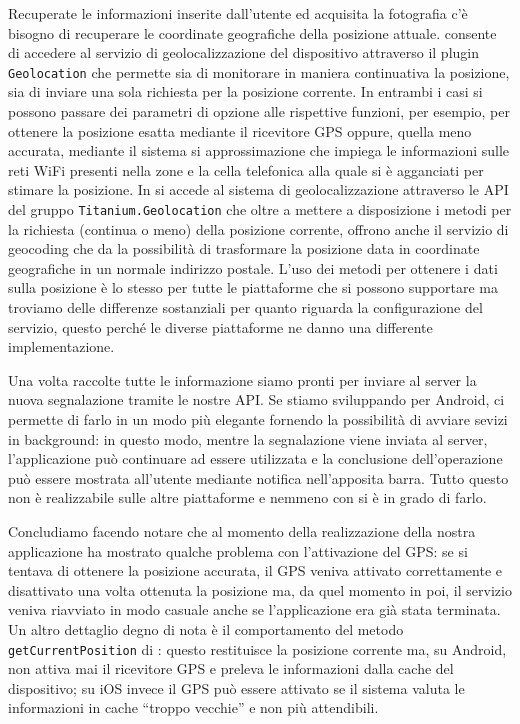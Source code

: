 			Recuperate le informazioni inserite dall'utente ed acquisita la
			fotografia c'è bisogno di recuperare le coordinate geografiche della
			posizione attuale. \pg{} consente di accedere al servizio di
			geolocalizzazione del dispositivo attraverso il plugin
			\texttt{Geolocation} che permette sia di monitorare in maniera
			continuativa la posizione, sia di inviare una sola richiesta per la
			posizione corrente. In entrambi i casi si possono passare dei
			parametri di opzione alle rispettive funzioni, per esempio, per
			ottenere la posizione esatta mediante il ricevitore GPS oppure,
			quella meno accurata, mediante il sistema si approssimazione che
			impiega le informazioni sulle reti WiFi presenti nella zone e la
			cella telefonica alla quale si è agganciati per stimare la
			posizione. In \tisdk{} si accede al sistema di
			geolocalizzazione attraverso le API del gruppo
			\texttt{Titanium.Geolocation} che oltre a mettere a disposizione i
			metodi per la richiesta (continua o meno) della posizione corrente,
			offrono anche il servizio di geocoding che da la possibilità di
			trasformare la posizione data in coordinate geografiche in un
			normale indirizzo postale. L'uso dei metodi per ottenere i dati
			sulla posizione è lo stesso per tutte le piattaforme che si possono
			supportare ma troviamo delle differenze sostanziali per quanto
			riguarda la configurazione del servizio, questo perché le diverse
			piattaforme ne danno una differente implementazione.
			
			Una volta raccolte tutte le informazione siamo pronti per inviare
			al server la nuova segnalazione tramite le nostre API. Se stiamo
			sviluppando per Android, \tisdk{} ci permette di farlo in un modo
			più elegante fornendo la possibilità di avviare sevizi in
			background: in questo modo, mentre la segnalazione viene inviata al
			server, l'applicazione può continuare ad essere utilizzata e la
			conclusione dell'operazione	può essere mostrata all'utente mediante
			notifica nell'apposita barra. Tutto questo non è realizzabile sulle
			altre piattaforme e nemmeno con \pg{} si è in grado di farlo.
			
			Concludiamo facendo notare che al momento della realizzazione della
			nostra applicazione \pg{} ha mostrato qualche problema con
			l'attivazione del GPS: se si tentava di ottenere la posizione
			accurata, il GPS veniva attivato correttamente e disattivato una
			volta ottenuta la posizione ma, da quel momento in poi, il servizio
			veniva riavviato in modo casuale anche se l'applicazione era già
			stata terminata. Un altro dettaglio degno di nota è il comportamento
			del metodo \texttt{getCurrentPosition} di \tisdk{}: questo
			restituisce la posizione corrente ma, su Android, non attiva mai il
			ricevitore GPS e preleva le informazioni dalla cache del
			dispositivo; su iOS invece il GPS può essere attivato se il sistema
			valuta le informazioni in cache ``troppo vecchie'' e non più
			attendibili.
			
